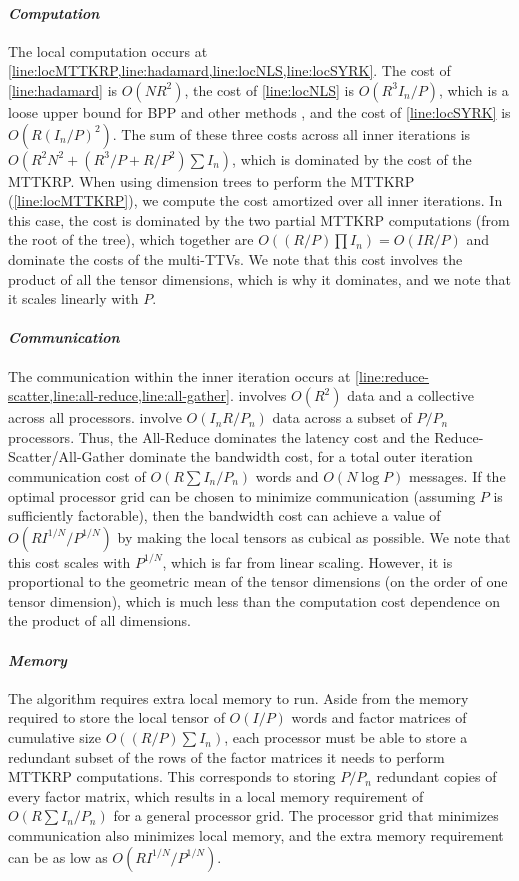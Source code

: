 \paragraph{\emph{Computation}}
The local computation occurs at \cref{line:locMTTKRP,line:hadamard,line:locNLS,line:locSYRK}.
The cost of \cref{line:hadamard} is $O(NR^2)$, the cost of \cref{line:locNLS} is $O(R^3I_n/P)$, which is a loose upper bound for BPP and other methods \cite{KBP16}, and the cost of \cref{line:locSYRK} is $O(R(I_n/P)^2)$.
The sum of these three costs across all inner iterations is $O(R^2N^2+(R^3/P+R/P^2)\sum I_n)$, which is dominated by the cost of the MTTKRP.
When using dimension trees to perform the MTTKRP (\cref{line:locMTTKRP}), we compute the cost amortized over all inner iterations.
In this case, the cost is dominated by the two partial MTTKRP computations (from the root of the tree), which together are $O((R/P) \prod I_n)=O(IR/P)$ and dominate the costs of the multi-TTVs.
We note that this cost involves the product of all the tensor dimensions, which is why it dominates, and we note that it scales linearly with $P$.

\paragraph{\emph{Communication}}
The communication within the inner iteration occurs at \cref{line:reduce-scatter,line:all-reduce,line:all-gather}.
 involves $O(R^2)$ data and a collective across all processors.
 involve $O(I_nR/P_n)$ data across a subset of $P/P_n$ processors.
Thus, the All-Reduce dominates the latency cost and the Reduce-Scatter/All-Gather dominate the bandwidth cost, for a total outer iteration communication cost of $O(R\sum I_n/P_n)$ words and $O(N\log P)$ messages.
If the optimal processor grid can be chosen to minimize communication (assuming $P$ is sufficiently factorable), then the bandwidth cost can achieve a value of $O(RI^{1/N}/P^{1/N})$ by making the local tensors as cubical as possible.
We note that this cost scales with $P^{1/N}$, which is far from linear scaling.
However, it is proportional to the geometric mean of the tensor dimensions (on the order of one tensor dimension), which is much less than the computation cost dependence on the product of all dimensions.

\paragraph{\emph{Memory}}
The algorithm requires extra local memory to run.
Aside from the memory required to store the local tensor of $O(I/P)$ words and factor matrices of cumulative size $O((R/P)\sum I_n)$, each processor must be able to store a redundant subset of the rows of the factor matrices it needs to perform MTTKRP computations.
This corresponds to storing $P/P_n$ redundant copies of every factor matrix, which results in a local memory requirement of $O(R \sum I_n/P_n)$ for a general processor grid.
The processor grid that minimizes communication also minimizes local memory, and the extra memory requirement can be as low as $O(RI^{1/N}/P^{1/N})$.

